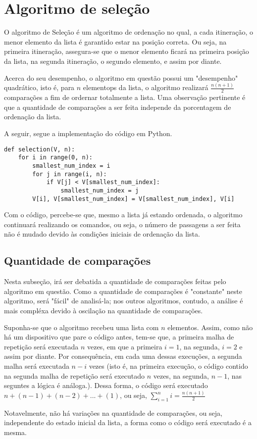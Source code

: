 \section{Algoritmo de seleção}
O algoritmo de Seleção é um algoritmo de ordenação no qual, a cada itineração, o menor elemento da lista é garantido estar na posição correta. Ou seja, na primeira itineração, assegura-se que o menor elemento ficará na primeira posição da lista, na segunda itineração, o segundo elemento, e assim por diante. 

Acerca do seu desempenho, o algoritmo em questão possui um "desempenho" quadrático, isto é, para $n$ elementops da lista, o algoritmo realizará $\frac{n(n+1)}{2}$ comparações a fim de ordernar totalmente a lista. Uma observação pertinente é que a quantidade de comparações a ser feita independe da porcentagem de ordenação da lista.

A seguir, segue a implementação do código em Python.

\begin{lstlisting}
def selection(V, n):
    for i in range(0, n):
        smallest_num_index = i
        for j in range(i, n):
            if V[j] < V[smallest_num_index]:
                smallest_num_index = j
        V[i], V[smallest_num_index] = V[smallest_num_index], V[i]

\end{lstlisting}

Com o código, percebe-se que, mesmo a lista já estando ordenada, o algoritmo continuará realizando os comandos, ou seja, o número de passagens a ser feita não é mudado devido às condições iniciais de ordenação da lista.
\subsection*{Quantidade de comparações}
Nesta subseção, irá ser debatida a quantidade de comparações feitas pelo algoritmo em questão. Como a quantidade de comparações é "constante" neste algoritmo, será "fácil" de analisá-la; nos outros algoritmos, contudo, a análise é mais compléxa devido à oscilação na quantidade de comparações.

Suponha-se que o algoritmo recebeu uma lista com $n$ elementos. Assim, como não há um dispositivo que pare o código antes, tem-se que, a primeira malha de repetição será executada $n$ vezes, em que a primeira $i=1$, na segunda, $i=2$ e assim por diante. Por consequência, em cada uma dessas execuções, a segunda malha será executada $n-i$ vezes (isto é, na primeira execução, o código contido na segunda malha de repetição será executado $n$ vezes, na segunda, $n-1$, nas seguntes a lógica é análoga.). Dessa forma, o código será executado $n+(n-1)+(n-2)+...+(1)$, ou seja, $\sum_{i=1}^n i = \frac{n(n+1)}{2}$

Notavelmente, não há variações na quantidade de comparações, ou seja, independente do estado inicial da lista, a forma como o código será executado é a mesma.